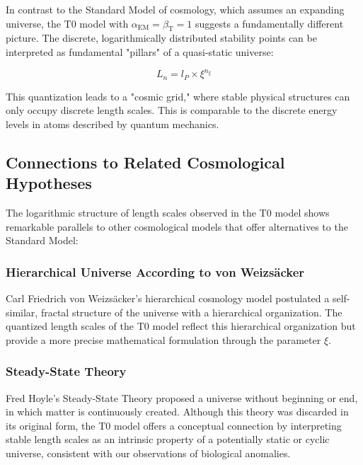 \documentclass[12pt,a4paper]{article}
\newcommand{\alphaEM}{\alpha_{\text{EM}}}
\newcommand{\betaT}{\beta_{\text{T}}}
\begin{document}
	In contrast to the Standard Model of cosmology, which assumes an expanding universe, the T0 model with $\alphaEM = \betaT = 1$ suggests a fundamentally different picture. The discrete, logarithmically distributed stability points can be interpreted as fundamental "pillars" of a quasi-static universe:
	
	\begin{equation}
		\label{eq:laengenquantisierung}
		L_n = l_P \times \xi^{n_\xi}
	\end{equation}
	
	This quantization leads to a "cosmic grid," where stable physical structures can only occupy discrete length scales. This is comparable to the discrete energy levels in atoms described by quantum mechanics.
	
	\subsection{Connections to Related Cosmological Hypotheses}
	\label{subsec:verwandte_hypothesen}
	
	The logarithmic structure of length scales observed in the T0 model shows remarkable parallels to other cosmological models that offer alternatives to the Standard Model:
	
	\subsubsection{Hierarchical Universe According to von Weizsäcker}
	\label{subsubsec:weizsaecker}
	
	Carl Friedrich von Weizsäcker's hierarchical cosmology model \cite{weizsacker1951} postulated a self-similar, fractal structure of the universe with a hierarchical organization. The quantized length scales of the T0 model reflect this hierarchical organization but provide a more precise mathematical formulation through the parameter $\xi$.
	
	\subsubsection{Steady-State Theory}
	\label{subsubsec:steady_state}
	
	Fred Hoyle's Steady-State Theory \cite{hoyle1948} proposed a universe without beginning or end, in which matter is continuously created. Although this theory was discarded in its original form, the T0 model offers a conceptual connection by interpreting stable length scales as an intrinsic property of a potentially static or cyclic universe, consistent with our observations of biological anomalies.
	
\end{document}
